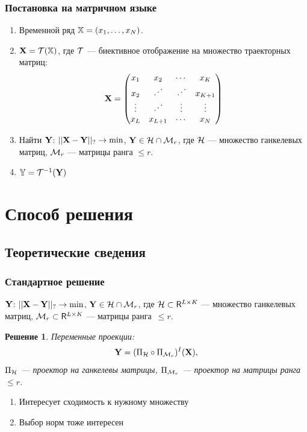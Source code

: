 \documentclass[unicode, notheorems]{beamer}
\newtheorem{solution}{Решение}
\begin{document}
\begin{frame}
	\frametitle{Постановка на матричном языке}
	\begin{enumerate}
		\item Временной ряд $\mathbb{X} = (x_1, \ldots, x_N)$.
		\item $\mathbf{X} = \mathcal{T}(\mathbb{X})$, где $\mathcal{T}$ --- биективное отображение на множество траекторных матриц:
		\begin{equation*}
		\mathbf{X} = \begin{pmatrix}
		x_1 & x_2 & \cdots & x_K \\ 
		x_2 & \iddots & \iddots & x_{K+1} \\ 
		\vdots & \iddots & \vdots & \vdots \\ 
		x_L & x_{L+1} & \cdots & x_N
		\end{pmatrix} 
		\end{equation*}
		\item Найти $\mathbf{Y}$: $||\mathbf{X} - \mathbf{Y}||_? \to \min$, $\mathbf{Y} \in \mathcal{H} \cap \mathcal{M}_r$, где $\mathcal{H}$ --- множество ганкелевых матриц, $\mathcal{M}_r$ --- матрицы ранга $\le r$.
		\item $\mathbb{Y} = \mathcal{T}^{-1}(\mathbf{Y})$
	\end{enumerate}
\end{frame}

\section{Способ решения}
\subsection{Теоретические сведения}
\begin{frame}
	\frametitle{Стандартное решение}
	$\mathbf{Y}$: $||\mathbf{X} - \mathbf{Y}||_? \to \min$, $\mathbf{Y} \in \mathcal{H} \cap \mathcal{M}_r$, где $\mathcal{H} \subset \mathsf{R}^{L \times K}$ --- множество ганкелевых матриц, $\mathcal{M}_r \subset \mathsf{R}^{L \times K}$ --- матрицы ранга~$\le r$.
	
	\begin{solution}
		
		Переменные проекции: 
		\begin{equation*}
		\mathbf{Y} = (\Pi_{\mathcal{H}} \circ \Pi_{\mathcal{M}_r})^I (\mathbf{X}),
		\end{equation*}
		$\Pi_{\mathcal{H}}$ --- проектор на ганкелевы матрицы, $\Pi_{\mathcal{M}_r}$ --- проектор на матрицы ранга $\le r$.
	\end{solution}
	\begin{enumerate}
	\item Интересует сходимость к нужному множеству
	\item Выбор норм тоже интересен
    \end{enumerate}
\end{frame}
\end{document}
